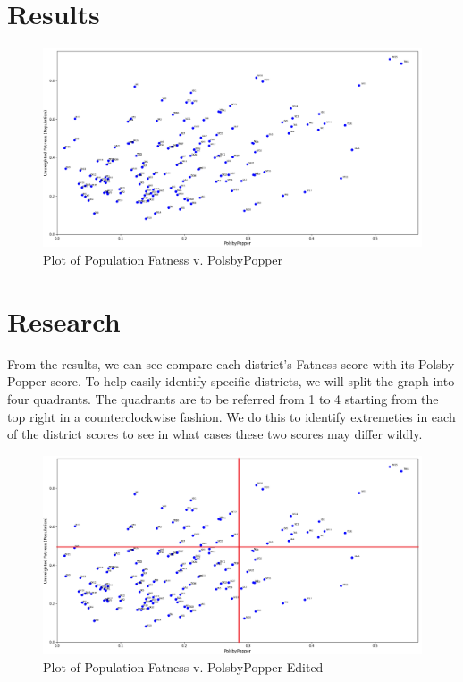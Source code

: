 \documentclass[letterpaper]{article}
\begin{document}
\section{Results}

\begin{figure}[H]
	\includegraphics[width=\linewidth]{./figures/fatnessPopulationVpolsbyPopper.png}
	\caption{Plot of Population Fatness v. PolsbyPopper}
	\label{fig:datapoints}
\end{figure}

\section{Research}
From the results, we can see compare each district's Fatness score with its Polsby Popper score. To help easily identify specific districts, we will split the graph into four quadrants. The quadrants are to be referred from 1 to 4 starting from the top right in a counterclockwise fashion. We do this to identify extremeties in each of the district scores to see in what cases these two scores may differ wildly.

\begin{figure}[H]
	\includegraphics[width=\linewidth]{./figures/fatnessPopulationVpolsbyPopperEdited.png}
	\caption{Plot of Population Fatness v. PolsbyPopper Edited}
	\label{fig:datapointsEdited}
\end{figure}
\end{document}
